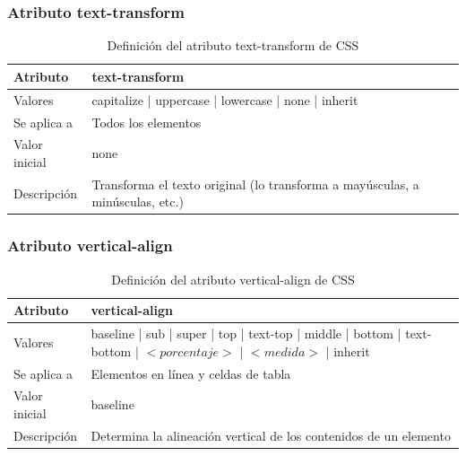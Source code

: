 \documentclass[ucs]{beamer}
\begin{document}
\begin{frame}
\frametitle{Atributo text-transform}

\begin{center}
  \begin{table}
   \begin{tabular}{p{1.8cm}p{7.8cm}}
Atributo & \bf{text-transform} \\ \hline
Valores& capitalize | uppercase | lowercase | none | inherit \\ \hline
Se aplica a& Todos los elementos \\ \hline
Valor inicial& none \\ \hline
Descripción& Transforma el texto original (lo transforma a mayúsculas, a minúsculas, etc.) \\ \hline
  \end{tabular}
   \caption{Definición del atributo text-transform de CSS}
 \end{table}
\end{center}


\end{frame}



\begin{frame}
\frametitle{Atributo vertical-align}

\begin{center}
  \begin{table}
   \begin{tabular}{p{1.8cm}p{7.8cm}}
Atributo & \bf{vertical-align} \\ \hline
Valores& baseline | sub | super | top | text-top | middle | bottom | text-bottom | $<porcentaje>$ | $<medida>$ | inherit \\ \hline
Se aplica a& Elementos en línea y celdas de tabla \\ \hline
Valor inicial& baseline \\ \hline
Descripción& Determina la alineación vertical de los contenidos de un elemento \\ \hline
  \end{tabular}
   \caption{Definición del atributo vertical-align de CSS}
 \end{table}
\end{center}


\end{frame}


\end{document}
